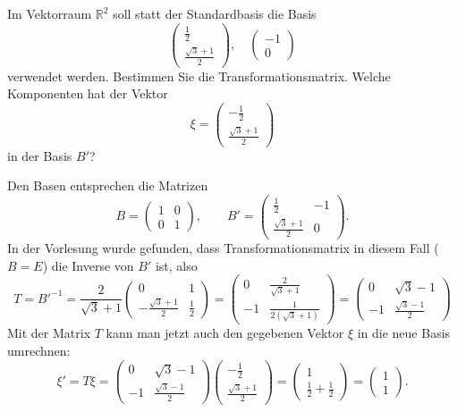 Im Vektorraum $\mathbb R^2$ soll statt der Standardbasis die Basis
\[
\begin{pmatrix}
\frac12\\
\frac{\sqrt{3}+1}2
\end{pmatrix},\quad
\begin{pmatrix}
-1\\
0
\end{pmatrix}
\]
verwendet werden.
Bestimmen Sie die Transformationsmatrix.
Welche Komponenten hat der Vektor
\[
\xi=
\begin{pmatrix}
-\frac12\\
\frac{\sqrt{3}+1}2
\end{pmatrix}
\]
in der Basis $B'$?

\begin{loesung}
Den Basen entsprechen die Matrizen
\[
B=\begin{pmatrix}1&0\\0&1\end{pmatrix},\qquad
B'=\begin{pmatrix}
\frac12&-1\\
\frac{\sqrt{3}+1}2&0
\end{pmatrix}.
\]
In der Vorlesung wurde gefunden, dass Transformationsmatrix in diesem
Fall ($B=E$) die Inverse von $B'$ ist, also
\[
T=B'^{-1}=\frac2{\sqrt{3}+1}\begin{pmatrix}
0&1\\
-\frac{\sqrt{3}+1}2&\frac12
\end{pmatrix}
=\begin{pmatrix}
0&\frac{2}{\sqrt{3}+1}\\
-1&\frac1{2(\sqrt{3}+1)}
\end{pmatrix}
=
\begin{pmatrix}
0&\sqrt{3}-1\\
-1&\frac{\sqrt{3}-1}{2}
\end{pmatrix}
\]
Mit der Matrix $T$ kann man jetzt auch den gegebenen Vektor $\xi$  in
die neue Basis umrechnen:
\[
\xi'=
T\xi
=
\begin{pmatrix}
0&\sqrt{3}-1\\
-1&\frac{\sqrt{3}-1}{2}
\end{pmatrix}
\begin{pmatrix}
-\frac12\\
\frac{\sqrt{3}+1}2
\end{pmatrix}
=
\begin{pmatrix}1\\
\frac12+\frac12\end{pmatrix}
=\begin{pmatrix}1\\1\end{pmatrix}.
\]
\end{loesung}

